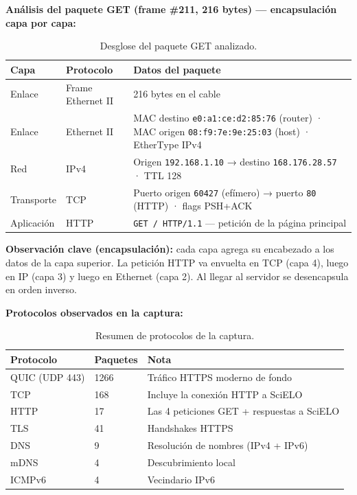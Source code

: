 \textbf{Análisis del paquete GET (frame \#211, 216 bytes) --- encapsulación capa por capa:}

\begin{table}[H]
  \centering
  \begin{tabular}{lll}
    \toprule
    Capa & Protocolo & Datos del paquete \\
    \midrule
    Enlace & Frame Ethernet II & 216 bytes en el cable \\
    Enlace & Ethernet II & MAC destino \texttt{e0:a1:ce:d2:85:76} (router) · MAC origen \texttt{08:f9:7e:9e:25:03} (host) · EtherType IPv4 \\
    Red & IPv4 & Origen \texttt{192.168.1.10} → destino \texttt{168.176.28.57} · TTL 128 \\
    Transporte & TCP & Puerto origen \texttt{60427} (efímero) → puerto \texttt{80} (HTTP) · flags PSH+ACK \\
    Aplicación & HTTP & \texttt{GET / HTTP/1.1} --- petición de la página principal \\
    \bottomrule
  \end{tabular}
  \caption{Desglose del paquete GET analizado.}
\end{table}

\textbf{Observación clave (encapsulación):} cada capa agrega su encabezado a los datos de la capa superior. La petición HTTP va envuelta en TCP (capa 4), luego en IP (capa 3) y luego en Ethernet (capa 2). Al llegar al servidor se desencapsula en orden inverso.

\textbf{Protocolos observados en la captura:}

\begin{table}[H]
  \centering
  \begin{tabular}{lll}
    \toprule
    Protocolo & Paquetes & Nota \\
    \midrule
    QUIC (UDP 443) & 1266 & Tráfico HTTPS moderno de fondo \\
    TCP & 168 & Incluye la conexión HTTP a SciELO \\
    HTTP & 17 & Las 4 peticiones GET + respuestas a SciELO \\
    TLS & 41 & Handshakes HTTPS \\
    DNS & 9 & Resolución de nombres (IPv4 + IPv6) \\
    mDNS & 4 & Descubrimiento local \\
    ICMPv6 & 4 & Vecindario IPv6 \\
    \bottomrule
  \end{tabular}
  \caption{Resumen de protocolos de la captura.}
\end{table}

